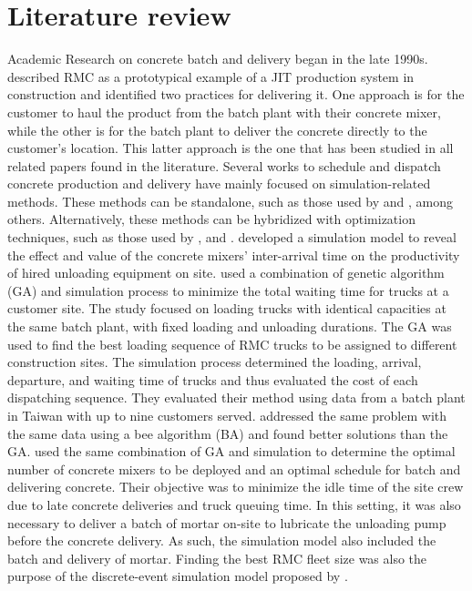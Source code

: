 \documentclass{article}
\begin{document}
\section{Literature review}
\label{lit_review}

Academic Research on concrete batch and delivery began in the late 1990s. \cite{tommelein1999just} described RMC as a prototypical example of a JIT production system in construction and identified two practices for delivering it. One approach is for the customer to haul the product from the batch plant with their concrete mixer, while the other is for the batch plant to deliver the concrete directly to the customer's location. This latter approach is the one that has been studied in all related papers found in the literature. Several works to schedule and dispatch concrete production and delivery have mainly focused on simulation-related methods. These methods can be standalone, such as those used by \cite{zayed2001simulation, wang2001scheduling, tian_simulation_based_2010, panas_simulation_based_2013} and \cite{galic2016simulation}, among others. Alternatively, these methods can be hybridized with optimization techniques, such as those used by \cite{feng2004optimizing, lu2005optimized}, and \cite{feng_integrating_2006}. \cite{wang2001scheduling} developed a simulation model to reveal the effect and value of the concrete mixers' inter-arrival time on the productivity of hired unloading equipment on site. \cite{feng2004optimizing} used a combination of genetic algorithm (GA) and simulation process to minimize the total waiting time for trucks at a customer site. The study focused on loading trucks with identical capacities at the same batch plant, with fixed loading and unloading durations. The GA was used to find the best loading sequence of RMC trucks to be assigned to different construction sites. The simulation process determined the loading, arrival, departure, and waiting time of trucks and thus evaluated the cost of each dispatching sequence. They evaluated their method using data from a batch plant in Taiwan with up to nine customers served. \cite{mayteekrieangkrai2015optimized} addressed the same problem with the same data using a bee algorithm (BA) and found better solutions than the GA. \cite{lu2005optimized} used the same combination of GA and simulation to determine the optimal number of concrete mixers to be deployed and an optimal schedule for batch and delivering concrete. Their objective was to minimize the idle time of the site crew due to late concrete deliveries and truck queuing time. In this setting, it was also necessary to deliver a batch of mortar on-site to lubricate the unloading pump before the concrete delivery. As such, the simulation model also included the batch and delivery of mortar. Finding the best RMC fleet size was also the purpose of the discrete-event simulation model proposed by \cite{panas_simulation_based_2013}.
\end{document}
